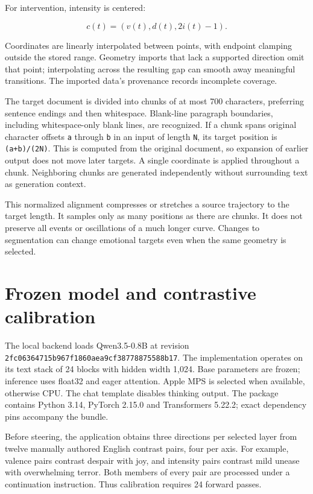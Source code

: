 \documentclass[manuscript,screen,nonacm]{acmart}
\begin{document}
For intervention, intensity is centered:

\[c(t)=(v(t),d(t),2i(t)-1).\]

Coordinates are linearly interpolated between points, with endpoint
clamping outside the stored range. Geometry imports that lack a
supported direction omit that point; interpolating across the resulting
gap can smooth away meaningful transitions. The imported data's
provenance records incomplete coverage.

The target document is divided into chunks of at most 700 characters,
preferring sentence endings and then whitespace. Blank-line paragraph
boundaries, including whitespace-only blank lines, are recognized. If a
chunk spans original character offsets \nolinkurl{a} through \nolinkurl{b} in
an input of length \nolinkurl{N}, its target position is
\nolinkurl{(a+b)/(2N)}. This is computed from the original document, so
expansion of earlier output does not move later targets. A single
coordinate is applied throughout a chunk. Neighboring chunks are
generated independently without surrounding text as generation context.

This normalized alignment compresses or stretches a source trajectory to
the target length. It samples only as many positions as there are
chunks. It does not preserve all events or oscillations of a much longer
curve. Changes to segmentation can change emotional targets even when
the same geometry is selected.

\section{Frozen model and contrastive
calibration}\label{frozen-model-and-contrastive-calibration}

The local backend loads Qwen3.5-0.8B at revision
\nolinkurl{2fc06364715b967f1860aea9cf38778875588b17}. The implementation
operates on its text stack of 24 blocks with hidden width 1,024. Base
parameters are frozen; inference uses float32 and eager attention. Apple
MPS is selected when available, otherwise CPU. The chat template
disables thinking output. The package contains Python 3.14, PyTorch
2.15.0 and Transformers 5.22.2; exact dependency pins accompany the
bundle.

Before steering, the application obtains three directions per selected
layer from twelve manually authored English contrast pairs, four per
axis. For example, valence pairs contrast despair with joy, and
intensity pairs contrast mild unease with overwhelming terror. Both
members of every pair are processed under a continuation instruction.
Thus calibration requires 24 forward passes.
\end{document}
